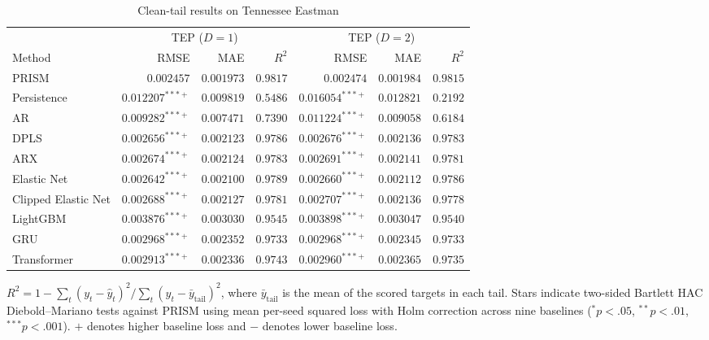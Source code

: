 \begin{table}[!t]
\centering
\caption{Clean-tail results on Tennessee Eastman}
\label{tab:clean-tep}
\small
\begin{tabular}{lrrrrrr}
\hline
 & \multicolumn{3}{c}{TEP ($D=1$)} & \multicolumn{3}{c}{TEP ($D=2$)} \\
\cline{2-4}\cline{5-7}
Method & RMSE & MAE & $R^2$ & RMSE & MAE & $R^2$ \\
\hline
PRISM & \(0.002457\) & \(0.001973\) & \(0.9817\) & \(0.002474\) & \(0.001984\) & \(0.9815\) \\
Persistence & \(0.012207^{\ast\ast\ast+}\) & \(0.009819\) & \(0.5486\) & \(0.016054^{\ast\ast\ast+}\) & \(0.012821\) & \(0.2192\) \\
AR & \(0.009282^{\ast\ast\ast+}\) & \(0.007471\) & \(0.7390\) & \(0.011224^{\ast\ast\ast+}\) & \(0.009058\) & \(0.6184\) \\
DPLS & \(0.002656^{\ast\ast\ast+}\) & \(0.002123\) & \(0.9786\) & \(0.002676^{\ast\ast\ast+}\) & \(0.002136\) & \(0.9783\) \\
ARX & \(0.002674^{\ast\ast\ast+}\) & \(0.002124\) & \(0.9783\) & \(0.002691^{\ast\ast\ast+}\) & \(0.002141\) & \(0.9781\) \\
Elastic Net & \(0.002642^{\ast\ast\ast+}\) & \(0.002100\) & \(0.9789\) & \(0.002660^{\ast\ast\ast+}\) & \(0.002112\) & \(0.9786\) \\
Clipped Elastic Net & \(0.002688^{\ast\ast\ast+}\) & \(0.002127\) & \(0.9781\) & \(0.002707^{\ast\ast\ast+}\) & \(0.002136\) & \(0.9778\) \\
LightGBM & \(0.003876^{\ast\ast\ast+}\) & \(0.003030\) & \(0.9545\) & \(0.003898^{\ast\ast\ast+}\) & \(0.003047\) & \(0.9540\) \\
GRU & \(0.002968^{\ast\ast\ast+}\) & \(0.002352\) & \(0.9733\) & \(0.002968^{\ast\ast\ast+}\) & \(0.002345\) & \(0.9733\) \\
Transformer & \(0.002913^{\ast\ast\ast+}\) & \(0.002336\) & \(0.9743\) & \(0.002960^{\ast\ast\ast+}\) & \(0.002365\) & \(0.9735\) \\
\hline
\end{tabular}
\par\smallskip
\parbox{0.96\textwidth}{\footnotesize $R^2=1-\sum_t(y_t-\hat y_t)^2/\sum_t(y_t-\bar y_{\mathrm{tail}})^2$, where $\bar y_{\mathrm{tail}}$ is the mean of the scored targets in each tail. Stars indicate two-sided Bartlett HAC Diebold--Mariano tests against PRISM using mean per-seed squared loss with Holm correction across nine baselines (\({}^*p<.05\), \({}^{**}p<.01\), \({}^{***}p<.001\)). \(+\) denotes higher baseline loss and \(-\) denotes lower baseline loss.}
\end{table}

